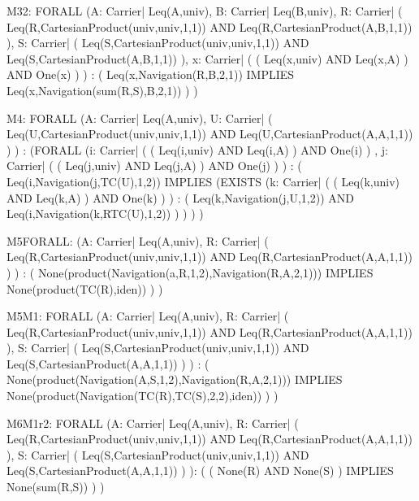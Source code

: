\begin{verbnobox}[\tiny]
M32:
	FORALL (A: Carrier| Leq(A,univ),
		   B: Carrier| Leq(B,univ), 
		   R: Carrier|  ( Leq(R,CartesianProduct(univ,univ,1,1)) AND Leq(R,CartesianProduct(A,B,1,1)) ),
		   S: Carrier|  ( Leq(S,CartesianProduct(univ,univ,1,1)) AND Leq(S,CartesianProduct(A,B,1,1)) ),
		   x: Carrier|  (  ( Leq(x,univ) AND Leq(x,A) )  AND One(x) ) ) : 
	  ( Leq(x,Navigation(R,B,2,1)) IMPLIES Leq(x,Navigation(sum(R,S),B,2,1)) ) )
\end{verbnobox}

\begin{verbnobox}[\tiny]	
M4:
	FORALL (A: Carrier| Leq(A,univ), 
		   U: Carrier| ( Leq(U,CartesianProduct(univ,univ,1,1)) AND Leq(U,CartesianProduct(A,A,1,1)) ) ) : 
	  (FORALL (i: Carrier|  (  ( Leq(i,univ) AND Leq(i,A) )  AND One(i) ) , 
			   j: Carrier|  (  ( Leq(j,univ) AND Leq(j,A) )  AND One(j) ) ) :  
			( Leq(i,Navigation(j,TC(U),1,2)) IMPLIES 
				(EXISTS (k: Carrier|  (  ( Leq(k,univ) AND Leq(k,A) )  AND One(k) ) ) :  
					( Leq(k,Navigation(j,U,1,2)) AND Leq(i,Navigation(k,RTC(U),1,2)) ) ) ) )
\end{verbnobox}

\begin{verbnobox}[\tiny]
M5FORALL:
	(A: Carrier| Leq(A,univ), 
		   R: Carrier|  ( Leq(R,CartesianProduct(univ,univ,1,1)) AND Leq(R,CartesianProduct(A,A,1,1)) ) ) : 
  ( None(product(Navigation(a,R,1,2),Navigation(R,A,2,1))) IMPLIES None(product(TC(R),iden)) ) )
\end{verbnobox}

\begin{verbnobox}[\tiny]
M5M1:
	FORALL (A: Carrier| Leq(A,univ), 
		   R: Carrier| ( Leq(R,CartesianProduct(univ,univ,1,1)) AND Leq(R,CartesianProduct(A,A,1,1)) ),
		   S: Carrier| ( Leq(S,CartesianProduct(univ,univ,1,1)) AND Leq(S,CartesianProduct(A,A,1,1)) ) ) : 
   ( None(product(Navigation(A,S,1,2),Navigation(R,A,2,1))) 
   IMPLIES None(product(Navigation(TC(R),TC(S),2,2),iden)) ) )
\end{verbnobox}

\begin{verbnobox}[\tiny]
M6M1r2:
	FORALL (A: Carrier| Leq(A,univ),
		   R: Carrier| ( Leq(R,CartesianProduct(univ,univ,1,1)) AND Leq(R,CartesianProduct(A,A,1,1)) ),
		   S: Carrier| ( Leq(S,CartesianProduct(univ,univ,1,1)) AND Leq(S,CartesianProduct(A,A,1,1)) ) ): 
		(  ( None(R) AND None(S) )  IMPLIES None(sum(R,S)) ) )
\end{verbnobox}

